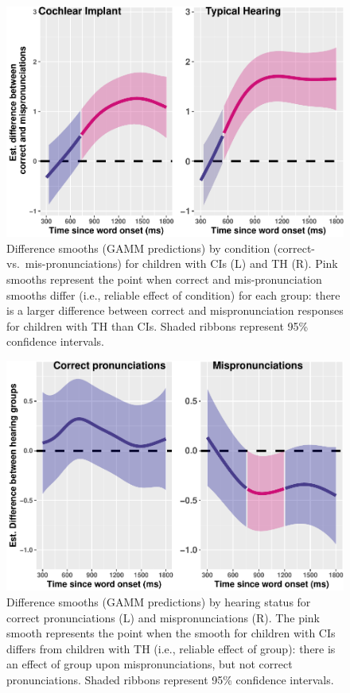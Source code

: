 \documentclass[
]{article}
\begin{document}
\begin{figure}
\centering
\includegraphics{2_modeling_files/figure-latex/ci-th-facet-plot-1.pdf}
\caption{\label{fig:ci-th-facet-plot}Difference smooths (GAMM predictions) by condition (correct- vs.~mis-pronunciations) for children with CIs (L) and TH (R). Pink smooths represent the point when correct and mis-pronunciation smooths differ (i.e., reliable effect of condition) for each group: there is a larger difference between correct and mispronunciation responses for children with TH than CIs. Shaded ribbons represent 95\% confidence intervals.}
\end{figure}

\begin{figure}
\centering
\includegraphics{2_modeling_files/figure-latex/real-mp-facet-plot-1.pdf}
\caption{\label{fig:real-mp-facet-plot}Difference smooths (GAMM predictions) by hearing status for correct pronunciations (L) and mispronunciations (R). The pink smooth represents the point when the smooth for children with CIs differs from children with TH (i.e., reliable effect of group): there is an effect of group upon mispronunciations, but not correct pronunciations. Shaded ribbons represent 95\% confidence intervals.}
\end{figure}
\end{document}
